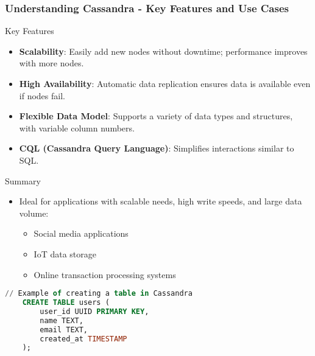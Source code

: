 \documentclass[aspectratio=169]{beamer}
\begin{document}
\begin{frame}[fragile]
    \frametitle{Understanding Cassandra - Key Features and Use Cases}
    \begin{block}{Key Features}
        \begin{itemize}
            \item \textbf{Scalability}: Easily add new nodes without downtime; performance improves with more nodes.
            \item \textbf{High Availability}: Automatic data replication ensures data is available even if nodes fail.
            \item \textbf{Flexible Data Model}: Supports a variety of data types and structures, with variable column numbers.
            \item \textbf{CQL (Cassandra Query Language)}: Simplifies interactions similar to SQL.
        \end{itemize}
    \end{block}

    \begin{block}{Summary}
        \begin{itemize}
            \item Ideal for applications with scalable needs, high write speeds, and large data volume:
                \begin{itemize}
                    \item Social media applications
                    \item IoT data storage
                    \item Online transaction processing systems
                \end{itemize}
        \end{itemize}
    \end{block}
    
    \begin{lstlisting}[language=SQL]
    // Example of creating a table in Cassandra
    CREATE TABLE users (
        user_id UUID PRIMARY KEY,
        name TEXT,
        email TEXT,
        created_at TIMESTAMP
    );
    \end{lstlisting}
\end{frame}
\end{document}

